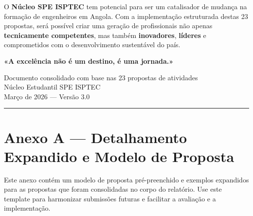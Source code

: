 \documentclass[12pt,a4paper]{article}
\begin{document}
O \textbf{Núcleo SPE ISPTEC} tem potencial para ser um catalisador de mudança na formação de engenheiros em Angola. Com a implementação estruturada destas 23 propostas, será possível criar uma geração de profissionais não apenas \textcolor{spe-blue}{\textbf{tecnicamente competentes}}, mas também \textcolor{spe-secondary}{\textbf{inovadores}}, \textcolor{accent}{\textbf{líderes}} e comprometidos com o desenvolvimento sustentável do país.

\vspace{1.2cm}

\begin{center}
{\Large\color{spe-blue}\textbf{«A excelência não é um destino, é uma jornada.»}}

\vspace{0.8cm}

{\small\color{spe-secondary}
Documento consolidado com base nas 23 propostas de atividades \\
Núcleo Estudantil SPE ISPTEC \\
Março de 2026 — Versão 3.0
}
\end{center}
\textcolor{spe-secondary}{\rule{\linewidth}{0.5pt}}


\newpage
\section*{Anexo A — Detalhamento Expandido e Modelo de Proposta}

Este anexo contém um modelo de proposta pré-preenchido e exemplos expandidos para as propostas que foram consolidadas no corpo do relatório. Use este template para harmonizar submissões futuras e facilitar a avaliação e a implementação.
\end{document}
